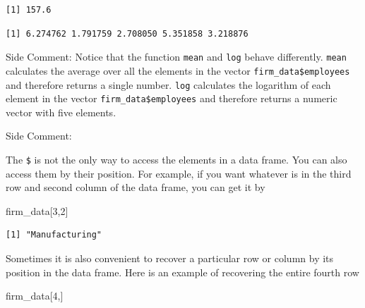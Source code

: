 \documentclass[
  letterpaper,
  DIV=11,
  numbers=noendperiod]{scrreprt}
\newenvironment{Shaded}{\begin{snugshade}}{\end{snugshade}}
\newcommand{\DecValTok}[1]{\textcolor[rgb]{0.68,0.00,0.00}{#1}}
\newcommand{\FunctionTok}[1]{\textcolor[rgb]{0.28,0.35,0.67}{#1}}
\newcommand{\NormalTok}[1]{\textcolor[rgb]{0.00,0.23,0.31}{#1}}
\newcommand{\SpecialCharTok}[1]{\textcolor[rgb]{0.37,0.37,0.37}{#1}}
\begin{document}
\begin{Shaded}
\end{Shaded}

\begin{verbatim}
[1] 157.6
\end{verbatim}

\begin{Shaded}
\end{Shaded}

\begin{verbatim}
[1] 6.274762 1.791759 2.708050 5.351858 3.218876
\end{verbatim}

{Side Comment:} Notice that the function \texttt{mean} and \texttt{log}
behave differently. \texttt{mean} calculates the average over all the
elements in the vector \texttt{firm\_data\$employees} and therefore
returns a single number. \texttt{log} calculates the logarithm of each
element in the vector \texttt{firm\_data\$employees} and therefore
returns a numeric vector with five elements.

{Side Comment:}

The \texttt{\$} is not the only way to access the elements in a data
frame. You can also access them by their position. For example, if you
want whatever is in the third row and second column of the data frame,
you can get it by

\begin{Shaded}
\begin{Highlighting}[]
\NormalTok{firm\_data[}\DecValTok{3}\NormalTok{,}\DecValTok{2}\NormalTok{]}
\end{Highlighting}
\end{Shaded}

\begin{verbatim}
[1] "Manufacturing"
\end{verbatim}

Sometimes it is also convenient to recover a particular row or column by
its position in the data frame. Here is an example of recovering the
entire fourth row

\begin{Shaded}
\begin{Highlighting}[]
\NormalTok{firm\_data[}\DecValTok{4}\NormalTok{,]}
\end{Highlighting}
\end{Shaded}
\end{document}
